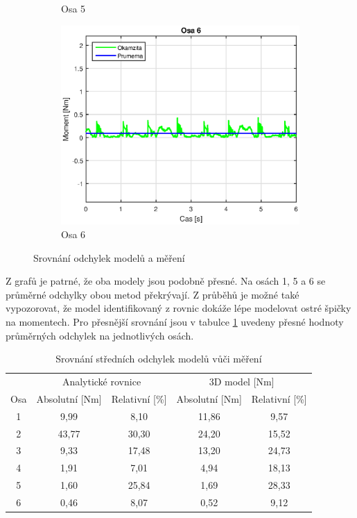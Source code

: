 \begin{figure}
\begin{subfigure}[b]{0.7\textwidth}
        \caption{Osa 5}
        \label{osa_5_odch_pic}
    \end{subfigure}
    \begin{subfigure}[b]{0.7\textwidth}
        \includegraphics[width=\textwidth]{Osa_6_odch}
        \caption{Osa 6}
        \label{osa_6_odch_pic}
    \end{subfigure}
    \caption{Srovnání odchylek modelů a měření}\label{osy_odch_pic}
\end{figure}

\clearpage

Z grafů je patrné, že oba modely jsou podobně přesné. Na osách 1, 5 a 6 se průměrné odchylky obou metod překrývají. Z průběhů je možné také vypozorovat, že model identifikovaný z rovnic dokáže lépe modelovat ostré špičky na momentech. Pro přesnější srovnání jsou v tabulce \ref{tab_srov_odch} uvedeny přesné hodnoty průměrných odchylek na jednotlivých osách.

\hfill
\begin{table}[htbp]
  \centering
  \caption{Srovnání středních odchylek modelů vůči měření}
    \begin{tabular}{c|cc|cc}
          & \multicolumn{2}{c|}{Analytické rovnice} & \multicolumn{2}{c}{3D model [Nm]} \\
    Osa   & Absolutní [Nm] & Relativní [\%]  & Absolutní [Nm] & Relativní [\%] \\
    \hline
    1     & 9,99  & 8,10  & 11,86 & 9,57  \\
    2     & 43,77 & 30,30 & 24,20 & 15,52 \\
    3     & 9,33  & 17,48 & 13,20 & 24,73 \\
    4     & 1,91  & 7,01  & 4,94  & 18,13 \\
    5     & 1,60  & 25,84 & 1,69  & 28,33 \\
    6     & 0,46  & 8,07  & 0,52  & 9,12  \\
    \end{tabular}%
  \label{tab_srov_odch}%
\end{table}%

